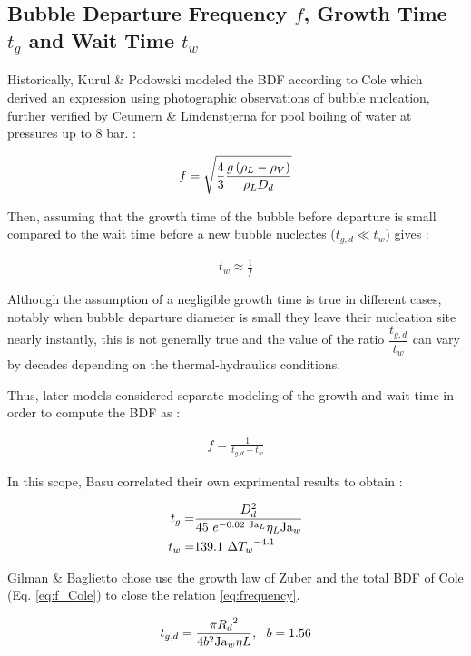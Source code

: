\subsection{Bubble Departure Frequency $f$, Growth Time $t_{g}$ and Wait Time $t_{w}$}


Historically, Kurul \& Podowski modeled the BDF according to Cole \cite{Cole} which derived an expression using photographic observations of bubble nucleation, further verified by Ceumern \& Lindenstjerna for pool boiling of water at pressures up to 8 bar. :

\begin{align}
f = \sqrt{\frac{4}{3} \frac{g \left( \rho_{L}-\rho_{V} \right)}{\rho_{L}D_{d}} }
\label{eq:f_Cole}
\end{align}

Then, assuming that the growth time of the bubble before departure is small compared to the wait time before a new bubble nucleates ($t_{g,d} \ll t_{w}$) gives :

\begin{align}
t_{w} \approx \frac{1}{f}
\end{align}


Although the assumption of a negligible growth time is true in different cases, notably when bubble departure diameter is small \ie they leave their nucleation site nearly instantly, this is not generally true and the value of the ratio $\dfrac{t_{g,d}}{t_{w}}$ can vary by decades depending on the thermal-hydraulics conditions.

Thus, later models considered separate modeling of the growth and wait time in order to compute the BDF as :

\begin{align}
f = \frac{1}{t_{g,d} + t_{w} }
\label{eq:frequency}
\end{align}


In this scope, Basu \etal \cite{Basu} correlated their own exprimental results to obtain :

\begin{align}
t_{g} =& \frac{D_{d}^{2} }{45~e^{-0.02~\mathrm{Ja}_{L}} \eta_{L} \mathrm{Ja}_{w}} \label{eq:tg_Basu}
 \\
t_{w} =&  139.1\ {\Delta T_{w}}^{-4.1}
\label{eq:tw_Basu}
\end{align}


Gilman \& Baglietto \cite{Gilman} chose use the growth law of Zuber \cite{Zuber1961} and the total BDF of Cole (Eq. \ref{eq:f_Cole}) to close the relation \ref{eq:frequency}.

\begin{align}
t_{g,d} = \frac{\pi {R_{d}}^{2}}{4b^{2} \mathrm{Ja}_{w} \eta{L}},\ \ b=1.56
\end{align}